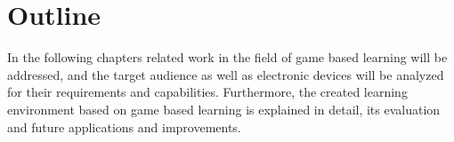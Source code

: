 \section{Outline}\label{sec:outlook}
In the following chapters related work in the field of game based learning will be addressed,
and the target audience as well as electronic devices will be analyzed for their requirements and capabilities.
Furthermore, the created learning environment based on game based learning is explained in detail, its evaluation and
future applications and improvements.
